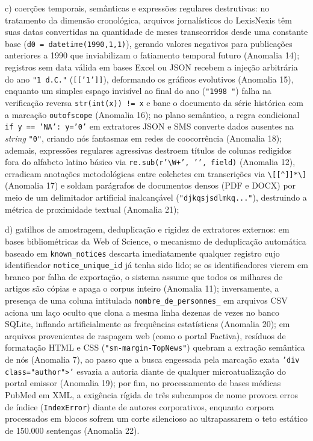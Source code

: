 \documentclass[
	oneside,
	a4paper,
	12pt,
	chapter=TITLE,
	section=TITLE,
	english,
	brazilian
]{abntex2}
\begin{document}
\par\indent c) coerções temporais, semânticas e expressões regulares destrutivas: no tratamento da dimensão cronológica, arquivos jornalísticos do LexisNexis têm suas datas convertidas na quantidade de meses transcorridos desde uma constante base (\texttt{d0 = datetime(1990,1,1)}), gerando valores negativos para publicações anteriores a 1990 que inviabilizam o fatiamento temporal futuro (Anomalia 14); registros sem data válida em bases Excel ou JSON recebem a injeção arbitrária do ano \texttt{"1 d.\allowbreak C."} (\texttt{[['1']]}), deformando os gráficos evolutivos (Anomalia 15), enquanto um simples espaço invisível ao final do ano (\texttt{"1998 "}) falha na verificação reversa \texttt{str(int(x)) != x} e bane o documento da série histórica com a marcação \texttt{outofscope} (Anomalia 16); no plano semântico, a regra condicional \texttt{if y == 'NA': y='0'} em extratores JSON e SMS converte dados ausentes na \textit{string} \texttt{"0"}, criando nós fantasmas em redes de coocorrência (Anomalia 18); ademais, expressões regulares agressivas destroem títulos de colunas redigidos fora do alfabeto latino básico via \texttt{re.\allowbreak sub(r'\textbackslash{}W+', '{}', field)} (Anomalia 12), erradicam anotações metodológicas entre colchetes em transcrições via \texttt{\textbackslash{}[[\textasciicircum{}]]*\textbackslash{}]} (Anomalia 17) e soldam parágrafos de documentos densos (PDF e DOCX) por meio de um delimitador artificial inalcançável (\texttt{"djkqsjsdlmkq..."}), destruindo a métrica de proximidade textual (Anomalia 21);
\par\indent d) gatilhos de amostragem, deduplicação e rigidez de extratores externos: em bases bibliométricas da Web of Science, o mecanismo de deduplicação automática baseado em \texttt{known\_\allowbreak notices} descarta imediatamente qualquer registro cujo identificador \texttt{notice\_\allowbreak unique\_\allowbreak id} já tenha sido lido; se os identificadores vierem em branco por falha de exportação, o sistema assume que todos os milhares de artigos são cópias e apaga o corpus inteiro (Anomalia 11); inversamente, a presença de uma coluna intitulada \texttt{nombre\_\allowbreak de\_\allowbreak personnes\_\allowbreak } em arquivos CSV aciona um laço oculto que clona a mesma linha dezenas de vezes no banco SQLite, inflando artificialmente as frequências estatísticas (Anomalia 20); em arquivos provenientes de raspagem web (como o portal Factiva), resíduos de formatação HTML e CSS (\texttt{"sm-margin-TopNews"}) quebram a extração semântica de nós (Anomalia 7), ao passo que a busca engessada pela marcação exata \texttt{'div class="author">'} esvazia a autoria diante de qualquer microatualização do portal emissor (Anomalia 19); por fim, no processamento de bases médicas PubMed em XML, a exigência rígida de três subcampos de nome provoca erros de índice (\texttt{IndexError}) diante de autores corporativos, enquanto corpora processados em blocos sofrem um corte silencioso ao ultrapassarem o teto estático de 150.000 sentenças (Anomalia 22).
\end{document}
